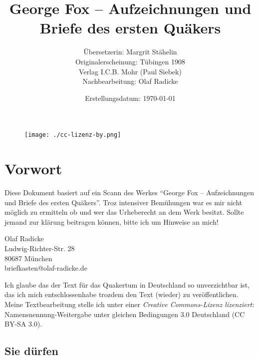 \documentclass[a4paper,12pt,twoside]{book} %
\title{George Fox -- Aufzeichnungen und Briefe des ersten Quäkers}
\author{Übersetzerin: Margrit Stähelin \\ 
Originalerscheinung: Tübingen 1908 \\ 
Verlag I.C.B. Mohr (Paul Siebek) \\
Nachbearbeitung: Olaf Radicke
}
\date{Erstellungsdatum: \today}
\begin{document}
\maketitle


\begin{figure}[h!]
 \centering
 \texttt{[image: ./cc-lizenz-by.png]}
\end{figure}

\newpage 

\tableofcontents

\newpage

\frontmatter 

\chapter{Vorwort}
\label{sec:vorwort}

Diese Dokument basiert auf ein Scann des Werkes ``George Fox -- 
Aufzeichnungen und Briefe des ersten Quäkers''. Troz intensiver Bemühungen war es mir nicht
möglich zu ermitteln ob und wer das Urheberecht an dem Werk besitzt. Sollte jemand zur
klärung beitragen können, bitte ich um Hinweise an mich!

\begin{center}
Olaf Radicke \\
Ludwig-Richter-Str. 28 \\
80687 München \\
briefkasten@olaf-radicke.de \\
\end{center}

Ich glaube das der Text für das Quakertum in Deutschland so unverzichtbar ist,
das ich mich entschlossenhabe trozdem den Text (wieder) zu veröffentlichen. Meine 
Textbearbeitung stelle ich unter einer \textit{Creative Commons-Lizenz lizenziert}: 
Namensnennung-Weitergabe unter gleichen Bedingungen 3.0 Deutschland (CC BY-SA 3.0).

\section{Sie dürfen}
\end{document}
